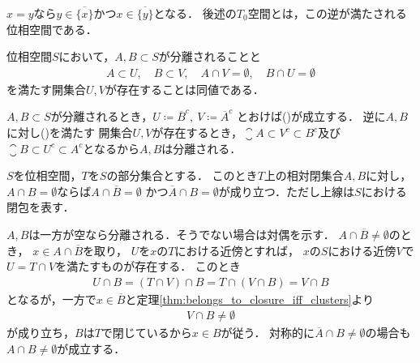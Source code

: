 	\begin{prf}
		$x = y$なら$y \in \overline{\{x\}}$かつ$x \in \overline{\{y\}}$となる．
		後述の$T_0$空間とは，この逆が満たされる位相空間である．
		\QED
	\end{prf}
	
	\begin{screen}
		\begin{thm}[分離される集合は他方を含まない近傍を持つ]
		\label{thm:the_equivalent_condition_of_separatedness}
			位相空間$S$において，$A,B \subset S$が分離されることと
			\begin{align}
				A \subset U,\quad B \subset V,\quad 
				A \cap V = \emptyset,
				\quad B \cap U = \emptyset
				\label{eq:thm_the_equivalent_condition_of_separatedness}
			\end{align}
			を満たす開集合$U,V$が存在することは同値である．
		\end{thm}
	\end{screen}
	
	\begin{prf}
		$A,B \subset S$が分離されるとき，$U \coloneqq \overline{B}^c,\ V \coloneqq \overline{A}^c$
		とおけば()が成立する．
		逆に$A,B$に対し()を満たす
		開集合$U,V$が存在するとき，$\closure{A} \subset V^c \subset B^c$及び
		$\closure{B} \subset U^c \subset A^c$となるから$A,B$は分離される．
		\QED
	\end{prf}
	
	\begin{screen}
		\begin{thm}[部分空間の互いに素な閉集合はもとの空間で分離される]
		\label{thm:disjoint_relative_closed_sets_are_separated}
			$S$を位相空間，$T$を$S$の部分集合とする．
			このとき$T$上の相対閉集合$A,B$に対し，
			$A \cap B = \emptyset$ならば$A \cap \overline{B} = \emptyset$
			かつ$\overline{A} \cap B = \emptyset$が成り立つ．ただし上線は$S$における閉包を表す．
		\end{thm}
	\end{screen}
	
	\begin{prf}
		$A,B$は一方が空なら分離される．そうでない場合は対偶を示す．
		$A \cap \overline{B} \neq \emptyset$のとき，
		$x \in A \cap \overline{B}$を取り，
		$U$を$x$の$T$における近傍とすれば，
		$x$の$S$における近傍$V$で$U = T \cap V$を満たすものが存在する．
		このとき
		\begin{align}
			U \cap B = (T \cap V) \cap B = T \cap (V \cap B) = V \cap B
		\end{align}
		となるが，一方で$x \in \overline{B}$と定理\ref{thm:belongs_to_closure_iff_clusters}より
		\begin{align}
			V \cap B \neq \emptyset
		\end{align}
		が成り立ち，$B$は$T$で閉じているから$x \in B$が従う．
		対称的に$\overline{A} \cap B \neq \emptyset$の場合も
		$A \cap B \neq \emptyset$が成立する．
		\QED
	\end{prf}
	

